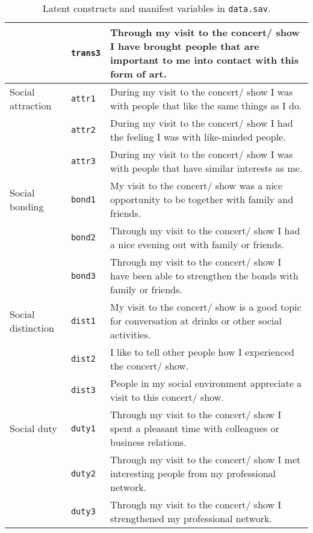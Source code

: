 \begin{table}[!ht]
\begin{tabular}{llp{11cm}}
                                & \texttt{trans3}    & Through my visit to the concert/ show I have brought people that are important to me into contact with this form of art. \\
        \hline
        Social attraction       & \texttt{attr1}     & During my visit to the concert/ show I was with people that like the same things as I do. \\
                                & \texttt{attr2}     & During my visit to the concert/ show I had the feeling I was with like-minded people. \\
                                & \texttt{attr3}     & During my visit to the concert/ show I was with people that have similar interests as me. \\
        \hline
        Social bonding          & \texttt{bond1}     & My visit to the concert/ show was a nice opportunity to be together with family and friends. \\
                                & \texttt{bond2}     & Through my visit to the concert/ show I had a nice evening out with family or friends. \\
                                & \texttt{bond3}     & Through my visit to the concert/ show I have been able to strengthen the bonds with family or friends. \\
        \hline
        Social distinction      & \texttt{dist1}     & My visit to the concert/ show is a good topic for conversation at drinks or other social activities. \\
                                & \texttt{dist2}     & I like to tell other people how I experienced the concert/ show. \\
                                & \texttt{dist3}     & People in my social environment appreciate a visit to this concert/ show. \\
        \hline
        Social duty             & \texttt{duty1}     & Through my visit to the concert/ show I spent a pleasant time with colleagues or business relations. \\
                                & \texttt{duty2}     & Through my visit to the concert/ show I met interesting people from my professional network. \\
                                & \texttt{duty3}     & Through my visit to the concert/ show I strengthened my professional network. \\
        \hline
    \end{tabular}
    \caption{Latent constructs and manifest variables in \texttt{data.sav}.}
    \label{tab:1}
\end{table}


